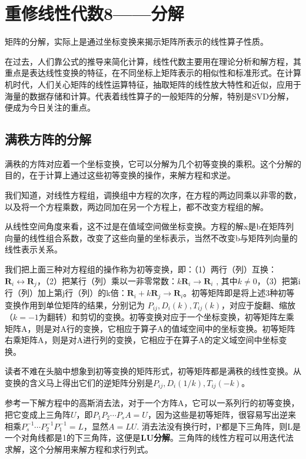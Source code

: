 \section{重修线性代数8——分解 }
矩阵的分解，实际上是通过坐标变换来揭示矩阵所表示的线性算子性质。

在过去，人们靠公式的推导来简化计算，线性代数主要用在理论分析和解方程，其重点是表达线性变换的特征，在不同坐标上矩阵表示的相似性和标准形式。在计算机时代，人们关心矩阵的线性运算特征，抽取矩阵的线性放大特性和近似，应用于海量的数据存储和计算。代表着线性算子的一般矩阵的分解，特别是SVD分解，便成为今日关注的重点。

\subsection{满秩方阵的分解}
满秩的方阵对应着一个坐标变换，它可以分解为几个初等变换的乘积。这个分解的目的，在于计算上通过这些初等变换的操作，来解方程和求逆。

我们知道，对线性方程组，调换组中方程的次序，在方程的两边同乘以非零的数，以及将一个方程乘数，两边同加在另一个方程上，都不改变方程组的解。

从线性空间角度来看，这不过是在值域空间做坐标变换。方程的解x是b在矩阵列向量的线性组合系数，改变了这些向量的坐标表示，当然不改变b与矩阵列向量的线性表示关系。

我们把上面三种对方程组的操作称为初等变换，即：（1）两行（列）互换：$ \bm{R}_{i} \leftrightarrow \bm{R}_{j} $，（2）把某行（列）乘以一非零常数：$ k\bm{R}_{i}\rightarrow \bm{R}_{i} $ , 其中$ k\neq0 $，（3）把第i行（列）加上第j行（列）的k倍：$ \bm{R}_{i} + k\bm{R}_{j}\rightarrow \bm{R}_{i} $。初等矩阵即是将上述3种初等变换作用到单位矩阵的结果，分别记为  $ P_{ij},D_{i}(k),T_{ij}(k) $，对应于旋翻、缩放（$ k=-1 $为翻转）和剪切的变换。初等变换对应于一个坐标变换，初等矩阵左乘矩阵A，则是对A行的变换，它相应于算子A的值域空间中的坐标变换。初等矩阵右乘矩阵A，则是对A进行列的变换，它相应于在算子A的定义域空间中坐标变换。

读者不难在头脑中想象到初等变换的矩阵形式，初等矩阵都是满秩的线性变换。从变换的含义马上得出它们的逆矩阵分别是$ P_{ij},D_{i}(1/k),T_{ij}(-k) $。

参考一下解方程中的高斯消去法，对于一个方阵A，它可以一系列行的初等变换，把它变成上三角阵$ U $，即$ P_{1}P_{2}\cdots P_{s}A=U $，因为这些是初等矩阵，很容易写出逆来相乘$ P_{s}^{-1}\cdots P_{2}^{-1}P_{1}^{-1}=L $，显然$ A = LU $. 消去法没有换行时，P都是下三角阵，则L是一个对角线都是1的下三角阵，这便是\textbf{LU分解}。三角阵的线性方程可以用迭代法求解，这个分解用来解方程和求行列式。

